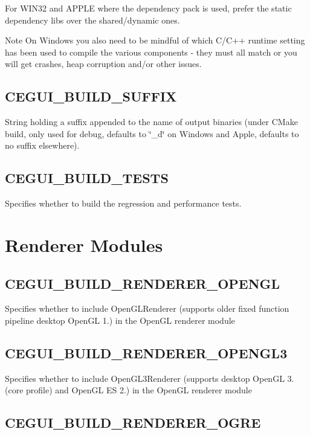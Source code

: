 For W\+I\+N32 and A\+P\+P\+LE where the dependency pack is used, prefer the static dependency libs over the shared/dynamic ones. \begin{DoxyNote}{Note}
On Windows you also need to be mindful of which C/\+C++ runtime setting has been used to compile the various components -\/ they must all match or you will get crashes, heap corruption and/or other issues. 
\end{DoxyNote}
\hypertarget{build_options_build_options_build_suffix}{}\subsection{C\+E\+G\+U\+I\+\_\+\+B\+U\+I\+L\+D\+\_\+\+S\+U\+F\+F\+IX}\label{build_options_build_options_build_suffix}
String holding a suffix appended to the name of output binaries (under C\+Make build, only used for debug, defaults to \char`\"{}\+\_\+d\char`\"{} on Windows and Apple, defaults to no suffix elsewhere). \hypertarget{build_options_build_options_build_tests}{}\subsection{C\+E\+G\+U\+I\+\_\+\+B\+U\+I\+L\+D\+\_\+\+T\+E\+S\+TS}\label{build_options_build_options_build_tests}
Specifies whether to build the regression and performance tests.\hypertarget{build_options_build_options_renderers}{}\section{Renderer Modules}\label{build_options_build_options_renderers}
\hypertarget{build_options_build_options_gl_renderer}{}\subsection{C\+E\+G\+U\+I\+\_\+\+B\+U\+I\+L\+D\+\_\+\+R\+E\+N\+D\+E\+R\+E\+R\+\_\+\+O\+P\+E\+N\+GL}\label{build_options_build_options_gl_renderer}
Specifies whether to include Open\+G\+L\+Renderer (supports older fixed function pipeline desktop Open\+GL 1.) in the Open\+GL renderer module \hypertarget{build_options_build_options_gl3_renderer}{}\subsection{C\+E\+G\+U\+I\+\_\+\+B\+U\+I\+L\+D\+\_\+\+R\+E\+N\+D\+E\+R\+E\+R\+\_\+\+O\+P\+E\+N\+G\+L3}\label{build_options_build_options_gl3_renderer}
Specifies whether to include Open\+G\+L3\+Renderer (supports desktop Open\+GL 3. (core profile) and Open\+GL ES 2.) in the Open\+GL renderer module \hypertarget{build_options_build_options_ogre_renderer}{}\subsection{C\+E\+G\+U\+I\+\_\+\+B\+U\+I\+L\+D\+\_\+\+R\+E\+N\+D\+E\+R\+E\+R\+\_\+\+O\+G\+RE}\label{build_options_build_options_ogre_renderer}
